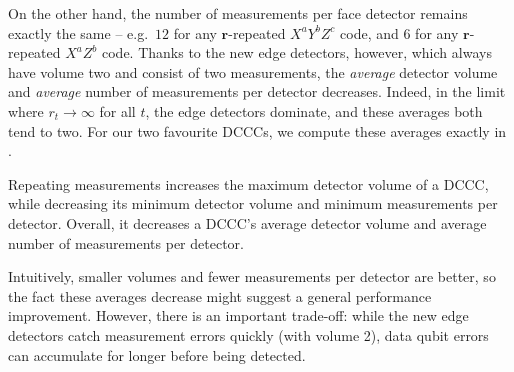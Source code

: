 On the other hand, the number of measurements per face detector remains exactly the same -- e.g.\ $12$ for any $\mathbf{r}$-repeated $X^a Y^b Z^c$ code, and 6 for any $\mathbf{r}$-repeated $X^a Z^b$ code.
Thanks to the new edge detectors, however, which always have volume two and consist of two measurements, the \emph{average} detector volume and \emph{average} number of measurements per detector decreases.
Indeed, in the limit where $r_t \to \infty$ for all $t$, the edge detectors dominate, and these averages both tend to two.
For our two favourite DCCCs, we compute these averages exactly in .

\begin{difference}\label{dif:repeating_detectors}
    Repeating measurements increases the maximum detector volume of a DCCC,
    while decreasing its minimum detector volume and minimum measurements per detector.
    Overall, it decreases a DCCC's average detector volume and average number of measurements per detector.
\end{difference}

Intuitively, smaller volumes and fewer measurements per detector are better, so the fact these averages decrease might suggest a general performance improvement.
However, there is an important trade-off: while the new edge detectors catch measurement errors quickly (with volume 2), data qubit errors can accumulate for longer before being detected.

